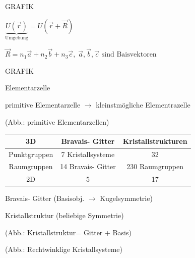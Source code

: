 GRAFIK

$\underbrace{U(\vec{r})}_{\text{Umgebung}}=U(\vec{r}+\vec{R})$

$\vec{R}=n_{1}\vec{a}+n_{2}\vec{b}+n_{3}\vec{c},\;\vec{a},\vec{b},\vec{c}\text{ sind Baisvektoren}$

GRAFIK

Elementarzelle

primitive Elementarzelle $\rightarrow$ kleinstmögliche Elementrazelle 

(Abb.: primitive Elementarzellen)

\begin{tabular}{|c|c|c|}
\hline 
3D & Bravais- Gitter & Kristallstrukturen\tabularnewline
\hline
\hline 
Punktgruppen & 7 Kristallsysteme & 32\tabularnewline
\hline 
Raumgruppen & 14 Bravais- Gitter & 230 Raumgruppen\tabularnewline
\hline 
2D  & 5 & 17\tabularnewline
\hline
\end{tabular}

Bravais- Gitter (Basisobj. $\rightarrow$ Kugelsymmetrie) 

Kristallstruktur (beliebige Symmetrie)

(Abb.: Kristallstruktur= Gitter + Basis)

(Abb.: Rechtwinklige Kristallsysteme) 
